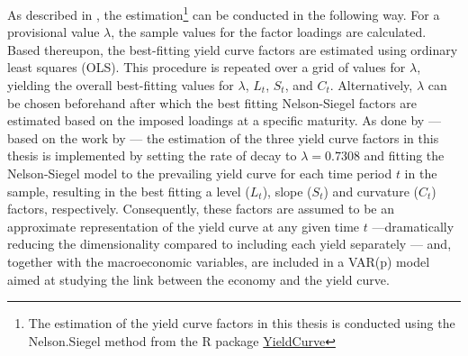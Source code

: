 As described in \citet{nelson1987parsimonious}, the estimation\footnote{The estimation of the yield curve factors in this thesis is conducted using the Nelson.Siegel method from the R package \href{https://cran.r-project.org/web/packages/YieldCurve/index.html}{YieldCurve}} can be conducted in the following way. For a provisional value $\lambda$, the sample values for the factor loadings are calculated. Based thereupon, the best-fitting yield curve factors are estimated using ordinary least squares (OLS). This procedure is repeated over a grid of values for $\lambda$, yielding the overall best-fitting values for $\lambda$, $L_{t}$, $S_{t}$, and $C_{t}$. 
Alternatively, $\lambda$ can be chosen beforehand after which the best fitting Nelson-Siegel factors are estimated based on the imposed loadings at a specific maturity.
As done by \citet{Fischer_et_al_2023} --- based on the work by \citet{diebold2006forecasting} --- the estimation of the three yield curve factors in this thesis is implemented by setting the rate of decay to $\lambda = 0.7308$ and fitting the Nelson-Siegel model to the prevailing yield curve for each time period $t$ in the sample, resulting in the best fitting a level ($L_{t}$), slope ($S_{t}$) and curvature ($C_{t}$) factors, respectively.
Consequently, these factors are assumed to be an approximate representation of the yield curve at any given time $t$ ---dramatically reducing the dimensionality compared to including each yield separately --- and, together with the macroeconomic variables, are included in a VAR(p) model aimed at studying the link between the economy and the yield curve. 

